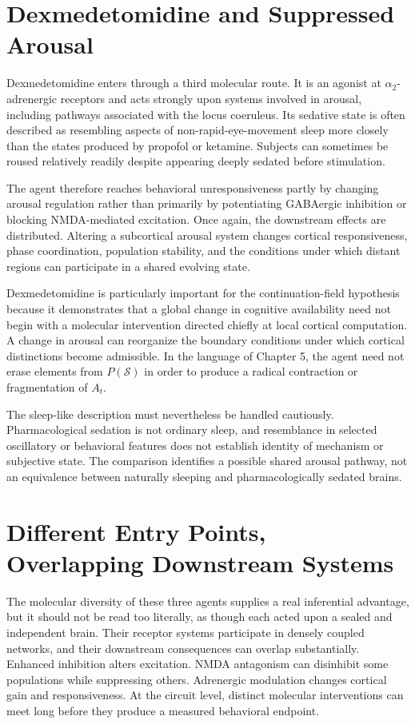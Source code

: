 \documentclass[11pt]{book}
\begin{document}
\section*{Dexmedetomidine and Suppressed Arousal}

Dexmedetomidine enters through a third molecular route. It is an agonist at $\alpha_2$-adrenergic receptors and acts strongly upon systems involved in arousal, including pathways associated with the locus coeruleus. Its sedative state is often described as resembling aspects of non-rapid-eye-movement sleep more closely than the states produced by propofol or ketamine. Subjects can sometimes be roused relatively readily despite appearing deeply sedated before stimulation.

The agent therefore reaches behavioral unresponsiveness partly by changing arousal regulation rather than primarily by potentiating GABAergic inhibition or blocking NMDA-mediated excitation. Once again, the downstream effects are distributed. Altering a subcortical arousal system changes cortical responsiveness, phase coordination, population stability, and the conditions under which distant regions can participate in a shared evolving state.

Dexmedetomidine is particularly important for the continuation-field hypothesis because it demonstrates that a global change in cognitive availability need not begin with a molecular intervention directed chiefly at local cortical computation. A change in arousal can reorganize the boundary conditions under which cortical distinctions become admissible. In the language of Chapter 5, the agent need not erase elements from $P(\mathcal S)$ in order to produce a radical contraction or fragmentation of $A_t$.

The sleep-like description must nevertheless be handled cautiously. Pharmacological sedation is not ordinary sleep, and resemblance in selected oscillatory or behavioral features does not establish identity of mechanism or subjective state. The comparison identifies a possible shared arousal pathway, not an equivalence between naturally sleeping and pharmacologically sedated brains.

\section*{Different Entry Points, Overlapping Downstream Systems}

The molecular diversity of these three agents supplies a real inferential advantage, but it should not be read too literally, as though each acted upon a sealed and independent brain. Their receptor systems participate in densely coupled networks, and their downstream consequences can overlap substantially. Enhanced inhibition alters excitation. NMDA antagonism can disinhibit some populations while suppressing others. Adrenergic modulation changes cortical gain and responsiveness. At the circuit level, distinct molecular interventions can meet long before they produce a measured behavioral endpoint.
\end{document}

